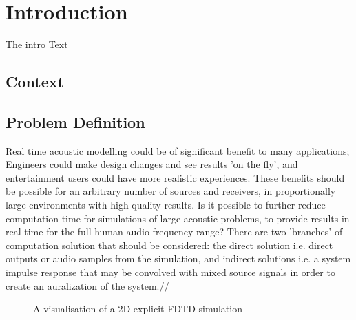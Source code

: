 \chapter{Introduction}

The intro Text

\section{Context}

\section{Problem Definition}
Real time acoustic modelling could be of significant benefit to many applications; Engineers could make design changes and see results 'on the fly', and entertainment users could have more realistic experiences. These benefits should be possible for an arbitrary number of sources and receivers, in proportionally large environments with high quality results. Is it possible to further reduce computation time for simulations of large acoustic problems, to provide results in real time for the full human audio frequency range? There are two 'branches' of computation solution that should be considered: the direct solution i.e. direct outputs or audio samples from the simulation, and indirect solutions i.e. a system impulse response that may be convolved with mixed source signals in order to create an auralization of the system.//


\begin{figure}
\centering
\centering
\caption{A visualisation of a 2D explicit FDTD simulation ~\cite{Durbridge2016a}}
\end{figure}

